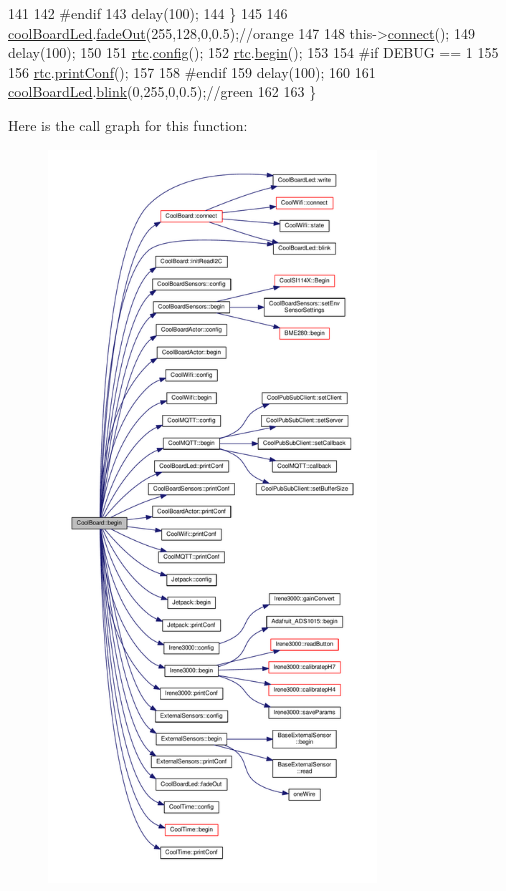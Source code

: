 \begin{DoxyCode}
141 
142 \textcolor{preprocessor}{    #endif}
143         delay(100);
144     \}
145     
146     \hyperlink{class_cool_board_a1b1d3c684a5baa56b08486e192fd8e97}{coolBoardLed}.\hyperlink{class_cool_board_led_a93d545679237e8cc858324367149775c}{fadeOut}(255,128,0,0.5);\textcolor{comment}{//orange}
147 
148     this->\hyperlink{class_cool_board_a519de78b807f8ec6463ff484eb925918}{connect}();
149     delay(100);
150 
151     \hyperlink{class_cool_board_a50d2a6716879d64a85f3c6b44ad63275}{rtc}.\hyperlink{class_cool_time_a87c28260c1bc77091162cbcf1ee2e129}{config}();
152     \hyperlink{class_cool_board_a50d2a6716879d64a85f3c6b44ad63275}{rtc}.\hyperlink{class_cool_time_ab1976cf718b950bc31e003c3323b8adb}{begin}();
153 
154 \textcolor{preprocessor}{#if DEBUG == 1}
155 
156     \hyperlink{class_cool_board_a50d2a6716879d64a85f3c6b44ad63275}{rtc}.\hyperlink{class_cool_time_af355e7f9b3898211cd2ff25eab5933b1}{printConf}();
157 
158 \textcolor{preprocessor}{#endif}
159     delay(100);
160     
161     \hyperlink{class_cool_board_a1b1d3c684a5baa56b08486e192fd8e97}{coolBoardLed}.\hyperlink{class_cool_board_led_a96e1ea13003eee34c9dbcef340404426}{blink}(0,255,0,0.5);\textcolor{comment}{//green}
162 
163 \}
\end{DoxyCode}
Here is the call graph for this function\+:
\nopagebreak
\begin{figure}[H]
\begin{center}
\leavevmode
\includegraphics[height=550pt]{d7/df9/class_cool_board_acba7c5aef7268b2c0044bdb54d3b9d76_cgraph}
\end{center}
\end{figure}
